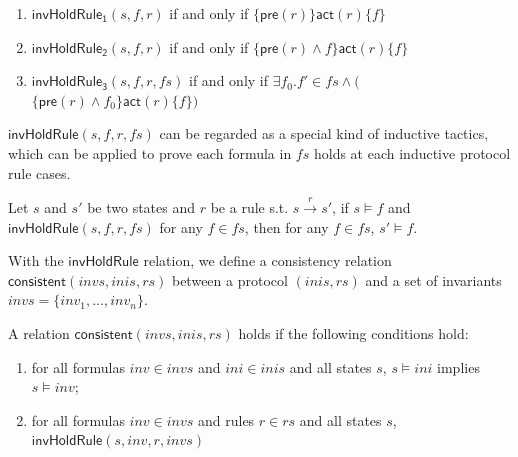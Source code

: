 \documentclass[final]{IEEEtran}
\def \andc {\wedge }
\newcommand \hoareTriple[3] {$\{#1\} #2  \{#3\}$}
\begin{document}
{\begin{enumerate}
\item $\mathsf{invHoldRule_1} (s,f,r)$ if and only if \hoareTriple{\mathsf{pre}(r)}{ \mathsf{act}(r)} {f}
\item $\mathsf{invHoldRule_2} (s,f,r)$ if and only if \hoareTriple{\mathsf{pre}(r) \andc f}{ \mathsf{act}(r)} {f}
\item $\mathsf{invHoldRule_3} (s,f,r,fs)$ if and only if $\exists f_0. f'\in fs \land ($\hoareTriple{\mathsf{pre}(r) \andc f_0}{ \mathsf{act}(r)} {f}$)$
\end{enumerate}

$\mathsf{invHoldRule}(s, f, r, fs)$ can be regarded as a
special kind of inductive tactics, which can be applied to prove
each formula in $fs$ holds at each inductive protocol rule cases.

\begin{lemma} \label{invHoldRuleIsIndut}
  Let $s$ and $s'$ be two states and $r$ be a rule s.t.  $s\overset{r}{\rightarrow } s'$, if  $s \models f$   and $\mathsf{invHoldRule}(s, f,r,fs)$ for any $f \in fs$,  then for any $f \in fs$, $s' \models f$.
\end{lemma}




With the $\mathsf{invHoldRule}$ relation, we define a consistency relation $\mathsf{consistent}( invs,inis, rs)$ between a protocol $(inis,rs)$ and a set of invariants $invs=\{inv_1,\ldots, inv_n\}$.

\begin{definition}
A relation  $\mathsf{consistent}( invs,inis, rs)$ holds if the following conditions hold:
\begin{enumerate}
\item for all formulas $inv\in invs$ and $ini\in inis$ and all states $s$,
$s \models ini$ implies $s \models inv$;
\item for all formulas $inv\in invs$ and rules  $r \in rs$ and all states $s$,  $\mathsf{invHoldRule}(s, inv, r, invs   )$
\end{enumerate}
\end{definition}


}
\end{document}
